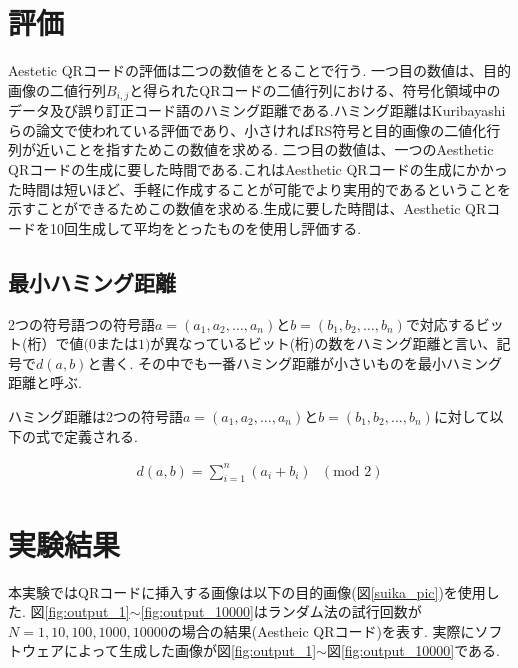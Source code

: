 \documentclass{thesis}
\begin{document}



\section{評価}
Aestetic QRコードの評価は二つの数値をとることで行う.
一つ目の数値は、目的画像の二値行列$B_{i,j}$と得られたQRコードの二値行列における、符号化領域中のデータ及び誤り訂正コード語のハミング距離である.ハミング距離はKuribayashiらの論文\cite{KURI}で使われている評価であり、小さければRS符号と目的画像の二値化行列が近いことを指すためこの数値を求める.
二つ目の数値は、一つのAesthetic QRコードの生成に要した時間である.これはAesthetic QRコードの生成にかかった時間は短いほど、手軽に作成することが可能でより実用的であるということを示すことができるためこの数値を求める.生成に要した時間は、Aesthetic QRコードを10回生成して平均をとったものを使用し評価する.

\subsection{最小ハミング距離}

2つの符号語つの符号語$a=(a_1,a_2,…,a_n)$と$b=(b_1,b_2,…,b_n)$で対応するビット(桁）で値$(0$または$1)$が異なっているビット(桁)の数をハミング距離と言い、記号で$d(a,b)$と書く.
その中でも一番ハミング距離が小さいものを最小ハミング距離と呼ぶ.

ハミング距離は2つの符号語$a=(a_1,a_2,…,a_n)$と$b=(b_1,b_2,…,b_n)$に対して以下の式で定義される.

\begin{eqnarray}
d(a,b)=\sum_{i=1}^{n}(a_{i}+b_{i})\mbox{ }(\mbox{mod } 2)
\end{eqnarray}

\section{実験結果}
本実験ではQRコードに挿入する画像は以下の目的画像(図\ref{suika_pic})を使用した.
図\ref{fig:output_1}$\sim$\ref{fig:output_10000}はランダム法の試行回数が$N=1,10,100,1000,10000$の場合の結果(Aestheic QRコード)を表す.
実際にソフトウェアによって生成した画像が図\ref{fig:output_1}$\sim$図\ref{fig:output_10000}である.
\end{document}
